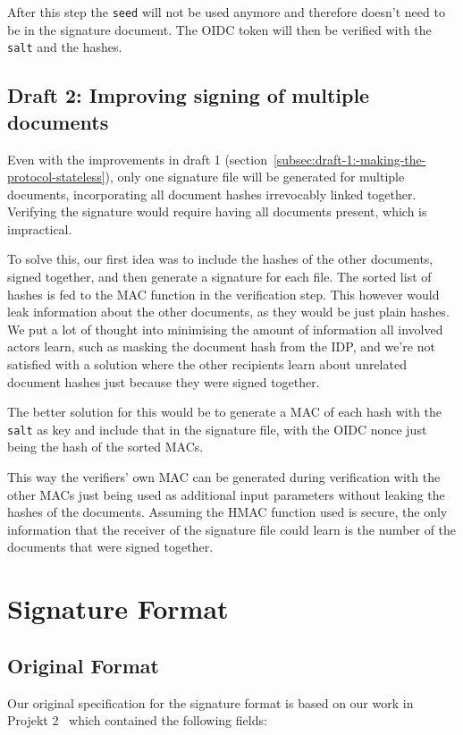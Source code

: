 After this step the \texttt{seed} will not be used anymore and therefore doesn't need to be in the signature document.
The \gls{OIDC} token will then be verified with the \texttt{salt} and the hashes.

\subsection{Draft 2: Improving signing of multiple documents}\label{subsec:draft-2:-improving-signing-of-multiple-documents}
Even with the improvements in draft 1 (section~\ref{subsec:draft-1:-making-the-protocol-stateless}),
only one signature file will be generated for multiple documents, incorporating all document hashes irrevocably linked together.
Verifying the signature would require having all documents present, which is impractical.

To solve this, our first idea was to include the hashes of the other documents, signed together,
and then generate a signature for each file.
The sorted list of hashes is fed to the \gls{MAC} function in the verification step.
This however would leak information about the other documents, as they would be just plain hashes.
We put a lot of thought into minimising the amount of information all involved actors learn,
such as masking the document hash from the \gls{IDP}, and we're not satisfied with a solution where the other recipients learn
about unrelated document hashes just because they were signed together.

The better solution for this would be to generate a \gls{MAC} of each hash with the \texttt{salt} as key and include that in the signature file,
with the \gls{OIDC} nonce just being the hash of the sorted \gls{MAC}s.

This way the verifiers' own \gls{MAC} can be generated during verification with the other \gls{MAC}s just being used as additional input parameters without leaking the hashes of the documents.
Assuming the \gls{HMAC} function used is secure,
the only information that the receiver of the signature file could learn is the number of the documents that were signed together.

\section{Signature Format}
\label{sec:signatureformat}

\subsection{Original Format}\label{subsec:original-format}
Our original specification for the signature format is based on our work in Projekt 2~\cite{projekt2} which contained the following fields:

